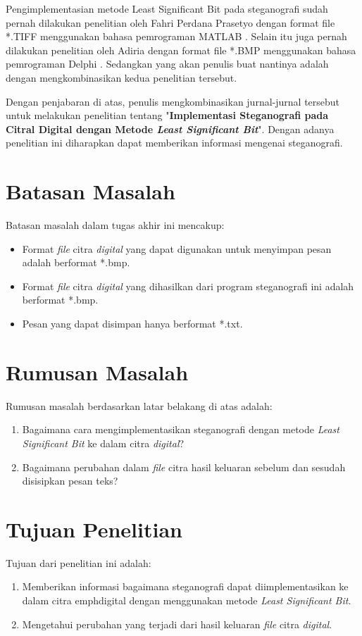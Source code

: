 Pengimplementasian metode Least Significant Bit pada steganografi sudah pernah dilakukan penelitian oleh Fahri Perdana Prasetyo dengan format file *.TIFF menggunakan bahasa pemrograman MATLAB \cite{prasetyo}. Selain itu juga pernah dilakukan penelitian oleh Adiria dengan format file *.BMP menggunakan bahasa pemrograman Delphi \cite{adiria}. Sedangkan yang akan penulis buat nantinya adalah dengan mengkombinasikan kedua penelitian tersebut.

Dengan penjabaran di atas, penulis mengkombinasikan jurnal-jurnal tersebut untuk melakukan penelitian tentang "\textbf{Implementasi Steganografi pada Citral Digital dengan Metode \emph{Least Significant Bit}}". Dengan adanya penelitian ini diharapkan dapat memberikan informasi mengenai steganografi.

\section{Batasan Masalah}
Batasan masalah dalam tugas akhir ini mencakup:
\begin{itemize}
	\item Format \emph{file}  citra \emph{digital} yang dapat digunakan untuk menyimpan pesan adalah berformat *.bmp.
	\item Format \emph{file}  citra \emph{digital} yang dihasilkan dari program steganografi ini adalah berformat *.bmp.
	\item Pesan yang dapat disimpan hanya berformat *.txt.
\end{itemize}

\section{Rumusan Masalah}
Rumusan masalah berdasarkan latar belakang di atas adalah:
\begin{enumerate}
	\item Bagaimana cara mengimplementasikan steganografi dengan metode \emph{Least Significant Bit} ke dalam citra \emph{digital}?
	\item Bagaimana perubahan dalam \emph{file} citra hasil keluaran sebelum dan sesudah disisipkan pesan teks?
\end{enumerate}

\section{Tujuan Penelitian}
Tujuan dari penelitian ini adalah: 
\begin{enumerate}
	\item Memberikan informasi bagaimana steganografi dapat diimplementasikan ke dalam citra emph{digital} dengan menggunakan metode \emph{Least Significant Bit}. 
	\item Mengetahui perubahan yang terjadi dari hasil keluaran \emph{file} citra \emph{digital}.
\end{enumerate}

